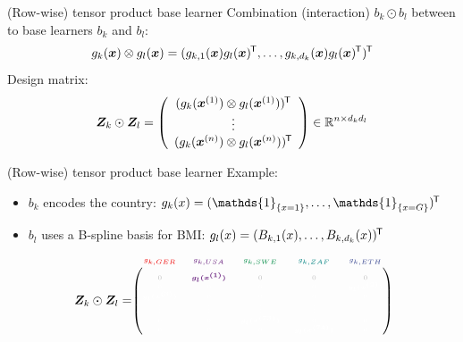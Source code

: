 \documentclass[t,10pt]{beamer}
\begin{document}
\begin{frame}{(Row-wise) tensor product base learner}
  Combination (interaction) $b_k \odot b_l$ between to base learners $b_k$ and $b_l$:
  \[g_k(\xv) \otimes g_l(\xv) = (g_{k,1}(\xv)g_l(\xv)^\tran, \dots, g_{k,d_k}(\xv)g_l(\xv)^\tran)^\tran \]
  Design matrix:
  \[
  \design_k \odot \design_l = \left(\begin{array}{c}
    (g_{k}(\xi[1]) \otimes g_l(\xi[1]))^\tran \\
    \vdots \\
    (g_{k}(\xi[n]) \otimes g_l(\xi[n]))^\tran
  \end{array}\right) \in\R^{n\times d_k d_l}
  \]
\end{frame}





\begin{frame}{(Row-wise) tensor product base learner}
  Example:
  \begin{itemize}
    \item $b_k$ encodes the country: $g_k(x) = (\mathds{1}_{\{x = 1\}}, \dots, \mathds{1}_{\{x = G\}})^\tran$
    \item $b_l$ uses a B-spline basis for BMI: $g_l(x) = (B_{k,1}(x), \dots, B_{k,d_k}(x))^\tran$
  \end{itemize}
  $$
    \design_k \odot \design_l = \tiny\begin{blockarray}{ccccc}
      \color[HTML]{EE0000}g_{k,GER} & \color[HTML]{631879}g_{k,USA} & \color[HTML]{008B45}g_{k,SWE} & \color[HTML]{008280}g_{k,ZAF} & \color[HTML]{3B4992}g_{k,ETH}\\
    \begin{block}{(ccccc)}
      \phantom{x}\\
      \color{lightgray}0 & \color[HTML]{631879}\bm{g_l(x^{(1)})} & \color{lightgray}0 & \color{lightgray}0 & \color{lightgray}0 \\
      \color{white}0 & \color{white}0 & \color{white}0 & \color{white}0 & \color{white}\bm{g_l(x^{(2)})} \\
      \color{white}\bm{g_l(x^{(3)})} & \color{white}0 & \color{white}0 & \color{white}0 & \color{white}0 \\
      \color{white}\vdots & \color{white}\vdots & \color{white}\vdots & \color{white}\vdots & \color{white}\vdots \\
      \color{white}0 & \color{white}0 & \color{white}\bm{g_l(x^{(73)})} & \color{white}0 & \color{white}0 \\
      \color{white}0 & \color{white}0 & \color{white}0 & \color{white}\bm{g_l(x^{(74)})} & \color{white}0 \\

\end{block}
\end{blockarray}$$
\end{frame}
\end{document}

